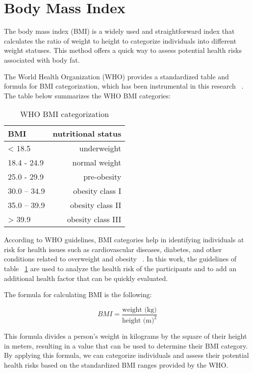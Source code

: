 \section{Body Mass Index}

The body mass index (BMI) is a widely used and straightforward index that calculates the ratio of weight to height to categorize individuals into different weight statuses. This method offers a quick way to assess potential health risks associated with body fat.

The World Health Organization (WHO) provides a standardized table and formula for BMI categorization, which has been instrumental in this research ~\cite{whoHealthyLifestyle}. The table below summarizes the WHO BMI categories:

\begin{table}[ht]
    \centering
\begin{tabular}{|l|r|}
\hline
\textbf{BMI} &  \textbf{nutritional status}  \\ \hline
< 18.5            &   underweight\\ \hline
18.4 - 24.9       &   normal weight \\ \hline
25.0 - 29.9       &   pre-obesity \\ \hline
30.0 – 34.9       &   obesity class I \\ \hline
35.0 – 39.9       &   obesity class II \\ \hline
> 39.9            &   obesity class III \\ \hline
\end{tabular}
\caption{WHO BMI categorization}
\label{table:BMI}
\end{table}

According to WHO guidelines, BMI categories help in identifying individuals at risk for health issues such as cardiovascular diseases, diabetes, and other conditions related to overweight and obesity ~\cite{whoHealthyLifestyle}. In this work, the guidelines of table ~\ref{table:BMI} are used to analyze the health risk of the participants and to add an additional health factor that can be quickly evaluated.

The formula for calculating BMI is the following:

\begin{equation}
    BMI = \frac{\text{weight (kg)}}{\text{height (m)}^2}
\end{equation}

This formula divides a person's weight in kilograms by the square of their height in meters, resulting in a value that can be used to determine their BMI category. By applying this formula, we can categorize individuals and assess their potential health risks based on the standardized BMI ranges provided by the WHO.

